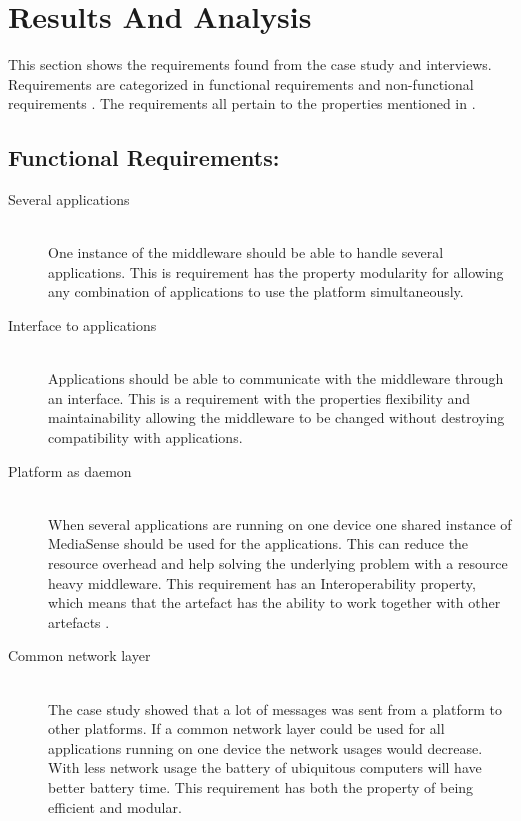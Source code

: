 \section{Results And Analysis}
This section shows the requirements found from the case study and interviews. Requirements are categorized in functional requirements and non-functional requirements \cite{Roman1985}. The requirements all pertain to the properties mentioned in \cite{johannesson2012design}. 

\subsection{Functional Requirements:}
\begin{description}
	\item[Several applications] \hfill \\
	One instance of the middleware should be able to handle several applications.
	This is requirement has the property modularity for allowing any combination of applications to use the platform simultaneously.
		
	
	\item[Interface to applications] \hfill \\
	Applications should be able to communicate with the middleware through an interface.
	This is a requirement with the properties flexibility and maintainability allowing the middleware to be changed without destroying compatibility with applications.
	
	\item[Platform as daemon] \hfill \\
	When several applications are running on one device one shared instance of MediaSense should be used for the applications. This can reduce the resource overhead and help solving the underlying problem with a resource heavy middleware. This requirement has an Interoperability property, which means that the artefact has the ability to work together with other artefacts \cite{johannesson2012design}. 
	
	\item[Common network layer] \hfill \\
	The case study showed that a lot of messages was sent from a platform to other platforms. If a common network layer could be used for all applications running on one device the network usages would decrease. With less network usage the battery of ubiquitous computers will have better battery time. This requirement has both the property of being efficient and modular. 
	

\end{description}
